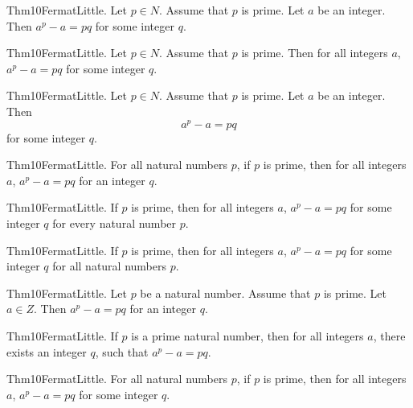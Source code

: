 \documentclass{article}
\begin{document}
Thm10FermatLittle. Let $p \in N$. Assume that $p$ is prime. Let $a$ be an integer. Then $a ^ {p}- a = p q$ for some integer $q$.

Thm10FermatLittle. Let $p \in N$. Assume that $p$ is prime. Then for all integers $a$, $a ^ {p}- a = p q$ for some integer $q$.

Thm10FermatLittle. Let $p \in N$. Assume that $p$ is prime. Let $a$ be an integer. Then $$a ^ {p}- a = p q$$ for some integer $q$.

Thm10FermatLittle. For all natural numbers $p$, if $p$ is prime, then for all integers $a$, $a ^ {p}- a = p q$ for an integer $q$.

Thm10FermatLittle. If $p$ is prime, then for all integers $a$, $a ^ {p}- a = p q$ for some integer $q$ for every natural number $p$.

Thm10FermatLittle. If $p$ is prime, then for all integers $a$, $a ^ {p}- a = p q$ for some integer $q$ for all natural numbers $p$.

Thm10FermatLittle. Let $p$ be a natural number. Assume that $p$ is prime. Let $a \in Z$. Then $a ^ {p}- a = p q$ for an integer $q$.

Thm10FermatLittle. If $p$ is a prime natural number, then for all integers $a$, there exists an integer $q$, such that $a ^ {p}- a = p q$.

Thm10FermatLittle. For all natural numbers $p$, if $p$ is prime, then for all integers $a$, $a ^ {p}- a = p q$ for some integer $q$.
\end{document}

